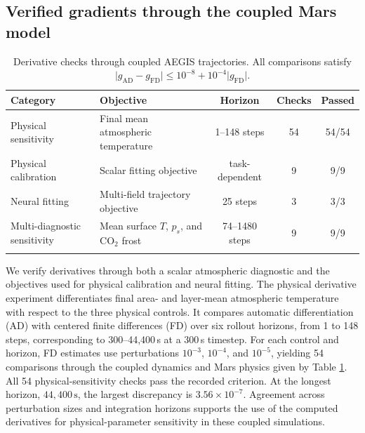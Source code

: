 \documentclass{article} %
\newcommand{\co}{CO$_2$}
\begin{document}

% 


\subsection{Verified gradients through the coupled Mars model}

\begin{table}[t]
\centering
\small
\caption{Derivative checks through coupled AEGIS trajectories. All
comparisons satisfy
\(\lvert g_{\mathrm{AD}}-g_{\mathrm{FD}}\rvert
\leq10^{-8}+10^{-4}\lvert g_{\mathrm{FD}}\rvert\).}
\label{tab:derivative_checks}
\begin{tabular}{llccc}
\toprule
Category & Objective & Horizon & Checks & Passed \\
\midrule
Physical sensitivity &
Final mean atmospheric temperature &
1--148 steps &
54 &
54/54 \\

Physical calibration &
Scalar fitting objective &
task-dependent &
9 &
9/9 \\

Neural fitting &
Multi-field trajectory objective &
25 steps &
3 &
3/3 \\

Multi-diagnostic sensitivity &
Mean surface $T$, $p_s$, and \co{} frost &
74--1480 steps &
9 &
9/9 \\
\bottomrule
\label{diff-table}
\end{tabular}
\end{table}


We verify derivatives through both a scalar atmospheric diagnostic and the objectives used for physical calibration and neural fitting. The physical derivative experiment differentiates final area- and layer-mean atmospheric temperature with respect to the three physical controls. It compares automatic differentiation (AD) with centered finite differences (FD) over six rollout horizons, from 1 to 148 steps, corresponding to 300--44{,}400\,s at a 300\,s
timestep. For each control and horizon, FD estimates use perturbations
\(10^{-3}\), \(10^{-4}\), and \(10^{-5}\), yielding 54 comparisons through the coupled dynamics and Mars physics given by Table \ref{diff-table}. All 54 physical-sensitivity checks pass the recorded criterion. At the longest horizon, \(44{,}400\,\mathrm{s}\), the largest discrepancy is \(3.56\times10^{-7}\). Agreement across perturbation sizes and integration horizons supports the use of the computed derivatives for physical-parameter sensitivity in these coupled simulations.
\end{document}
